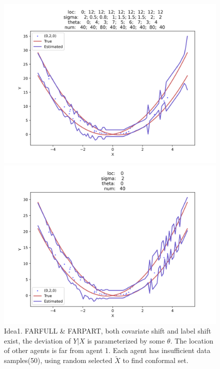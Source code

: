 \documentclass[12pt, a4paper, oneside]{article}
\begin{document}
    \begin{figure}[htbp]
        \centering
        \begin{minipage}{0.495\linewidth}
            \centering
            \includegraphics[width=0.98\linewidth]{fig/Ex1_2/FARSPARSEFULL.png}
        \end{minipage}
        \begin{minipage}{0.495\linewidth}
            \centering
            \includegraphics[width=0.98\linewidth]{fig/Ex1_2/FARSPARSEPART.png}
        \end{minipage}
        \caption{Idea1. FARFULL \& FARPART, both covariate shift and label shift exist, the deviation of $Y|X$ is parameterized by some $\theta$. The location of other agents is far from agent 1. Each agent has insufficient data samples(50), using random selected $\tilde{X}$ to find conformal set.}
        \label{Fig8}
    \end{figure}
\end{document}
